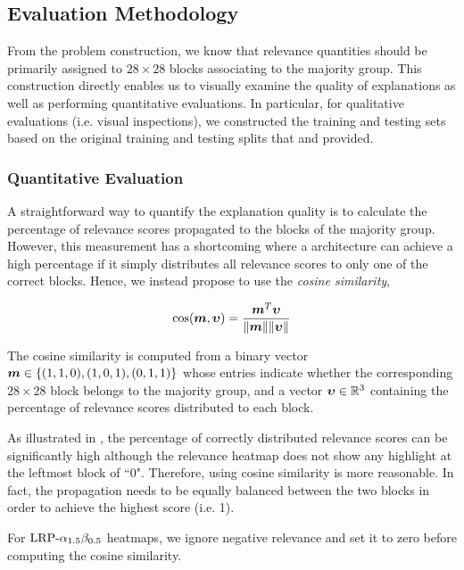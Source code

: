 \subsection{Evaluation Methodology}
\label{sec:evaluation_med}
From the problem construction, we know that relevance quantities should  be primarily assigned to $28\times28$ blocks associating to the majority group. This construction directly enables us to visually examine the quality of explanations as well as performing quantitative evaluations.  In particular, for qualitative evaluations (i.e. visual inspections), we constructed the training and testing sets based on the original training and testing splits that \citet{LeCunMNISThandwrittendigit2010} and \citet{XiaoFashionMNISTNovelImage2017} provided. 

\subsubsection{Quantitative Evaluation}
A straightforward way to quantify the explanation quality is to calculate the percentage of relevance scores propagated to the blocks of the majority group. However, this measurement has a shortcoming where a architecture can achieve a high percentage if it simply distributes all relevance scores to only one of the correct blocks. Hence, we instead propose to use the \textit{cosine similarity},


\begin{align*}
\cos (\patvector{m}, \patvector{\upsilon}) = \frac{ \patvector{m}^T \patvector{\upsilon}}{ \| \patvector{m}  \| \|\patvector{\upsilon}   \|}	
\end{align*}

The cosine similarity is computed from  a  binary  vector $\patvector{m} \in \{(1,1,0), (1,0,1), (0, 1, 1) \} $  whose entries indicate whether the corresponding $28\times28$ block belongs to the majority group, and a vector $\patvector{\upsilon} \in \mathbb{R}^3$ containing the percentage of  relevance scores distributed to each block. 


As illustrated in \addfigure{\ref{fig:quantitative_evaluation}}, the percentage of correctly distributed relevance scores can be significantly high although the relevance heatmap does not show any highlight at the leftmost block of ``0". Therefore, using cosine similarity is more reasonable. In fact, the propagation needs to be equally balanced between the two blocks in order to achieve the highest score (i.e. 1). 

For $\text{LRP-}\alpha_{1.5}\beta_{0.5}$ heatmaps, we ignore negative relevance and set it to zero before computing the cosine similarity.

